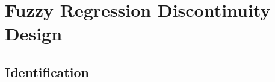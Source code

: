 \documentclass[xcolor=dvipsnames]{beamer}
\begin{document}

%
%
%
%
%
%
%
%
%
%

\section{Fuzzy Regression Discontinuity Design}

\subsection{Identification}
\end{document}
